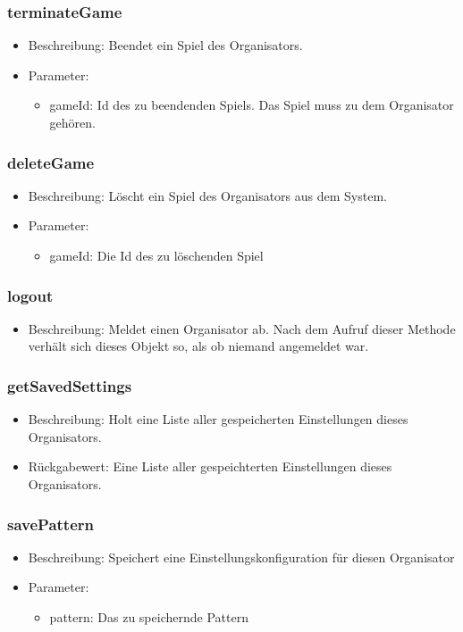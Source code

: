 \documentclass[a4paper]{scrreprt}
\begin{document}
	\subsubsection{terminateGame}
	\begin{itemize}
		\item Beschreibung: Beendet ein Spiel des Organisators.
		\item Parameter:
		\begin{itemize}
			\item gameId: Id des zu beendenden Spiels. Das Spiel muss zu dem Organisator gehören.
		\end{itemize}
	\end{itemize}
	\subsubsection{deleteGame}
	\begin{itemize}
		\item Beschreibung: Löscht ein Spiel des Organisators aus dem System.
		\item Parameter:
		\begin{itemize}
			\item gameId: Die Id des zu löschenden Spiel
		\end{itemize}
	\end{itemize}
	\subsubsection{logout}
	\begin{itemize}
		\item Beschreibung: Meldet einen Organisator ab. Nach dem Aufruf dieser Methode verhält sich dieses Objekt so, als ob niemand angemeldet war.
	\end{itemize}
	\subsubsection{getSavedSettings}
	\begin{itemize}
		\item Beschreibung: Holt eine Liste aller gespeicherten Einstellungen dieses Organisators.
		\item Rückgabewert: Eine Liste aller gespeichterten Einstellungen dieses Organisators.
	\end{itemize}
	\subsubsection{savePattern}
	\begin{itemize}
		\item Beschreibung: Speichert eine Einstellungskonfiguration für diesen Organisator
		\item Parameter:
		\begin{itemize}
			\item pattern: Das zu speichernde Pattern
		\end{itemize}
	\end{itemize}
\end{document}
